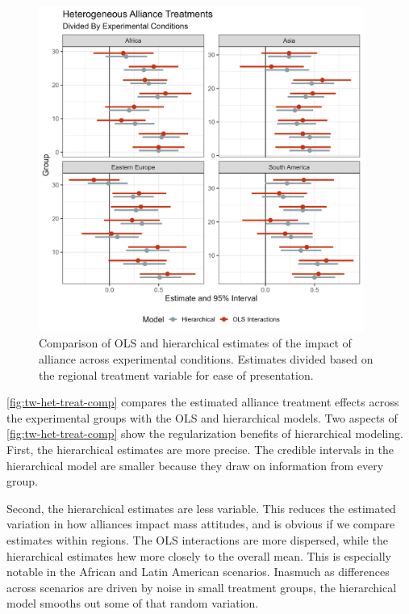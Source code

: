 \documentclass[12pt]{article}
\begin{document}
\begin{figure}[htpb]
	\centering
		\includegraphics[width=0.95\textwidth]{../figures/tw-het-treat-comp.png}
	\caption{Comparison of OLS and hierarchical estimates of the impact of alliance across experimental conditions. Estimates divided based on the regional treatment variable for ease of presentation.}
	\label{fig:tw-het-treat-comp}
\end{figure}


\autoref{fig:tw-het-treat-comp} compares the estimated alliance treatment effects across the experimental groups with the OLS and hierarchical models.
Two aspects of \autoref{fig:tw-het-treat-comp} show the regularization benefits of hierarchical modeling.
First, the hierarchical estimates are more precise. 
The credible intervals in the hierarchical model are smaller because they draw on information from every group. 


Second, the hierarchical estimates are less variable. 
This reduces the estimated variation in how alliances impact mass attitudes, and is obvious if we compare estimates within regions. 
The OLS interactions are more dispersed, while the hierarchical estimates hew more closely to the overall mean.
This is especially notable in the African and Latin American scenarios. 
Inasmuch as differences across scenarios are driven by noise in small treatment groups, the hierarchical model smooths out some of that random variation.
\end{document}
